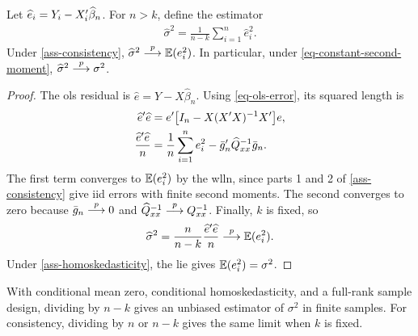 \documentclass[a4paper,12pt]{article}
\begin{document}
\begin{lemma}\label{lem-residual-variance}
	Let $\widehat e_i=Y_i-X_i^{\prime}\widehat\beta_n$.
	For $n>k$, define the estimator
	\begin{align*}
		\widehat\sigma^2=\frac1{n-k}\sum_{i=1}^n\widehat e_i^2.
	\end{align*}
	Under \autoref{ass-consistency}, $\widehat\sigma^2\overset{p}{\longrightarrow}\operatorname{\mathbb{E}}(e_i^2)$.
	In particular, under \eqref{eq-constant-second-moment}, $\widehat\sigma^2\overset{p}{\longrightarrow}\sigma^2$.
\end{lemma}
\begin{proof}
	The \gls{ols} residual is $\widehat e=Y-X\widehat\beta_n$.
	Using \eqref{eq-ols-error}, its squared length is
	\begin{align*}
		\widehat e^{\prime}\widehat e
		&=e^{\prime}\big[I_n-X(X^{\prime} X)^{-1} X^{\prime}\big]e,\\
		\frac{\widehat e^{\prime}\widehat e}{n}
		&=\frac1n\sum_{i=1}^n e_i^2-\bar g_n^{\prime}\widehat Q_{xx}^{-1}\bar g_n.
	\end{align*}
	The first term converges to $\operatorname{\mathbb{E}}(e_i^2)$ by the \gls{wlln},
	since parts 1 and 2 of \autoref{ass-consistency} give \gls{iid} errors with finite second moments.
	The second converges to zero because $\bar g_n\overset{p}{\longrightarrow}0$ and $\widehat Q_{xx}^{-1}\overset{p}{\longrightarrow} Q_{xx}^{-1}$.
	Finally, $k$ is fixed, so
	\begin{align*}
		\widehat\sigma^2
		=\frac{n}{n-k}\frac{\widehat e^{\prime}\widehat e}{n}\overset{p}{\longrightarrow}\operatorname{\mathbb{E}}(e_i^2).
	\end{align*}
	Under \autoref{ass-homoskedasticity}, the \gls{lie} gives $\operatorname{\mathbb{E}}(e_i^2)=\sigma^2$.
\end{proof}

\begin{remark}
	With conditional mean zero, conditional homoskedasticity, and a full-rank sample design,
	dividing by $n-k$ gives an unbiased estimator of $\sigma^2$ in finite samples.
	For consistency, dividing by $n$ or $n-k$ gives the same limit when $k$ is fixed.
\end{remark}
\end{document}
